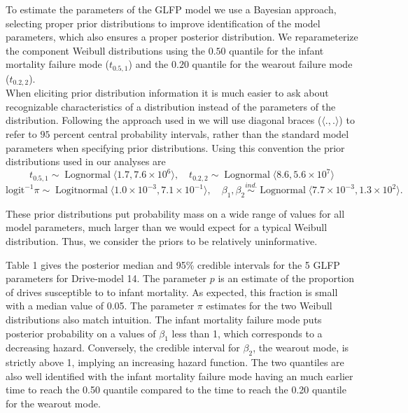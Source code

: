 \documentclass[aap]{imsart}
\newcommand{\op}{\operatorname}
\begin{document}
To estimate the parameters of the GLFP model we use a Bayesian approach, selecting proper prior distributions to improve identification of the model parameters, which also ensures a proper posterior distribution. We reparameterize the component Weibull distributions using the $0.50$ quantile for the infant mortality failure mode ($t_{0.5,1}$) and the $0.20$ quantile for the wearout failure mode ($t_{0.2,2}$). \\

When eliciting prior distribution information it is much easier to ask about recognizable characteristics of a distribution instead of the parameters of the distribution.  Following the approach used in \cite[Section 15.2.2]{intervals} we will use diagonal braces ($\langle.,.\rangle$) to refer to $95$ percent central probability intervals, rather than the standard model parameters when specifying prior distributions.  Using this convention the prior distributions used in our analyses are
$$t_{0.5,1} \sim \op{Lognormal} \langle 1.7,7.6\times 10^6 \rangle,\quad
t_{0.2,2} \sim \op{Lognormal}\langle 8.6, 5.6\times 10^7 \rangle$$
$$\mbox{logit}^{-1}\pi \sim \op{Logitnormal}\langle 1.0\times 10^{-3}, 7.1\times 10^{-1} \rangle,\quad
\beta_1, \beta_2 \stackrel{ind.}{\sim} \op{Lognormal}\langle 7.7 \times 10 ^{-3} ,1.3 \times 10^2 \rangle. $$

\noindent These prior distributions put probability mass on a wide range of values for all model parameters, much larger than we would expect for a typical Weibull distribution.  Thus, we consider the priors to be relatively uninformative. 


Table 1 gives the posterior median and 95\% credible intervals for the 5 GLFP parameters for Drive-model 14.  The parameter $p$ is an estimate of the proportion of drives susceptible to to infant mortality.  As expected, this fraction is small with a median value of 0.05.  The parameter $\pi$ estimates for the two Weibull distributions also match intuition.  The infant mortality failure mode puts posterior probability on a values of $\beta_1$ less than 1, which corresponds to a decreasing hazard.  Conversely, the credible interval for $\beta_2$, the wearout mode, is strictly above 1, implying an increasing hazard function.  The two quantiles are also well identified with the infant mortality failure mode having an much earlier time to reach the 0.50 quantile compared to the time to reach the 0.20 quantile for the wearout mode. 
\end{document}
